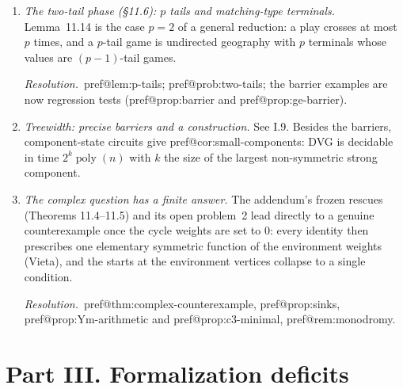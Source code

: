 \documentclass[11pt]{amsart}
\makeatletter
\newcommand{\pref}[1]{\csname pref@#1\endcsname}
\newcommand{\poly}{\operatorname{poly}}
\newcommand{\fix}{\par\noindent\emph{Resolution.}\ }
\makeatother
\begin{document}
\begin{enumerate}[label=\textbf{II.\arabic*},leftmargin=*,widest=II.8]
\item \emph{The two-tail phase (\S11.6): $p$ tails and matching-type terminals.} Lemma~11.14 is the case $p=2$ of a general reduction: a play crosses at most $p$ times, and a $p$-tail game is undirected geography with $p$ terminals whose values are $(p-1)$-tail games.
\fix \pref{lem:p-tails}; \pref{prob:two-tails}; the barrier examples are now regression tests (\pref{prop:barrier} and \pref{prop:ge-barrier}).

\item \emph{Treewidth: precise barriers and a construction.} See I.9. Besides the barriers, component-state circuits give \pref{cor:small-components}: DVG is decidable in time $2^{k}\poly(n)$ with $k$ the size of the largest non-symmetric strong component.

\item \emph{The complex question has a finite answer.} The addendum's frozen rescues (Theorems 11.4--11.5) and its open problem~2 lead directly to a genuine counterexample once the cycle weights are set to $0$: every identity then prescribes one elementary symmetric function of the environment weights (Vieta), and the starts at the environment vertices collapse to a single condition.
\fix \pref{thm:complex-counterexample}, \pref{prop:sinks}, \pref{prop:Ym-arithmetic} and \pref{prop:c3-minimal}, \pref{rem:monodromy}.
\end{enumerate}

\section*{Part III. Formalization deficits}
\end{document}
